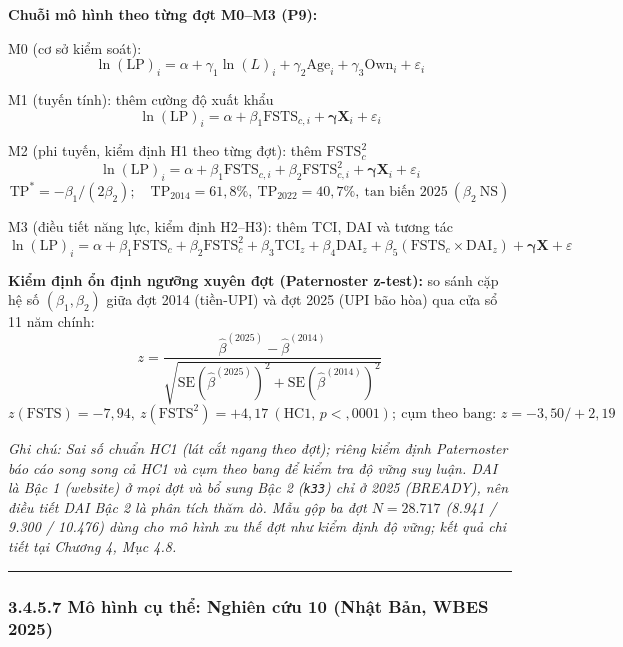 \documentclass[
  a4paper,
  13pt]{extreport}
\begin{document}
\textbf{Chuỗi mô hình theo từng đợt M0--M3 (P9):}

M0 (cơ sở kiểm soát):
\[\ln(\mathrm{LP})_{i} = \alpha + \gamma_1 \ln(L)_{i} + \gamma_2 \mathrm{Age}_{i} + \gamma_3 \mathrm{Own}_{i} + \varepsilon_{i}\]

M1 (tuyến tính): thêm cường độ xuất khẩu
\[\ln(\mathrm{LP})_{i} = \alpha + \beta_1 \mathrm{FSTS}_{c,i} + \boldsymbol{\gamma}\mathbf{X}_{i} + \varepsilon_{i}\]

M2 (phi tuyến, kiểm định H1 theo từng đợt): thêm
\(\mathrm{FSTS}_{c}^{2}\)
\[\ln(\mathrm{LP})_{i} = \alpha + \beta_1 \mathrm{FSTS}_{c,i} + \beta_2 \mathrm{FSTS}_{c,i}^{2} + \boldsymbol{\gamma}\mathbf{X}_{i} + \varepsilon_{i}\]
\[\mathrm{TP}^{*} = -\beta_1/(2\beta_2);\quad \mathrm{TP}_{2014} = 61{,}8\%,\ \mathrm{TP}_{2022} = 40{,}7\%,\ \text{tan biến } 2025\ (\beta_2\ \text{NS})\]

M3 (điều tiết năng lực, kiểm định H2--H3): thêm TCI, DAI và tương tác
\[\ln(\mathrm{LP})_{i} = \alpha + \beta_1 \mathrm{FSTS}_{c} + \beta_2 \mathrm{FSTS}_{c}^{2} + \beta_3 \mathrm{TCI}_{z} + \beta_4 \mathrm{DAI}_{z} + \beta_5(\mathrm{FSTS}_{c}\times\mathrm{DAI}_{z}) + \boldsymbol{\gamma}\mathbf{X} + \varepsilon\]

\textbf{Kiểm định ổn định ngưỡng xuyên đợt (Paternoster z-test):} so
sánh cặp hệ số \((\beta_1, \beta_2)\) giữa đợt 2014 (tiền-UPI) và đợt
2025 (UPI bão hòa) qua cửa sổ 11 năm chính:
\[z = \frac{\hat\beta^{(2025)} - \hat\beta^{(2014)}}{\sqrt{\mathrm{SE}(\hat\beta^{(2025)})^2 + \mathrm{SE}(\hat\beta^{(2014)})^2}}\]
\[z(\mathrm{FSTS}) = -7{,}94,\ z(\mathrm{FSTS}^2) = +4{,}17\ (\text{HC1, } p < {,}0001);\ \text{cụm theo bang: } z = -3{,}50/+2{,}19\]

\emph{Ghi chú: Sai số chuẩn HC1 (lát cắt ngang theo đợt); riêng kiểm
định Paternoster báo cáo song song cả HC1 và cụm theo bang để kiểm tra
độ vững suy luận. DAI là Bậc 1 (website) ở mọi đợt và bổ sung Bậc 2
(\texttt{k33}) chỉ ở 2025 (BREADY), nên điều tiết DAI Bậc 2 là phân tích
thăm dò. Mẫu gộp ba đợt \(N = 28.717\) (8.941 / 9.300 / 10.476) dùng cho
mô hình xu thế đợt như kiểm định độ vững; kết quả chi tiết tại Chương 4,
Mục 4.8.}

\begin{center}\rule{0.5\linewidth}{0.5pt}\end{center}

\hypertarget{muxf4-huxecnh-cux1ee5-thux1ec3-nghiuxean-cux1ee9u-10-nhux1eadt-bux1ea3n-wbes-2025}{%
\subsubsection{3.4.5.7 Mô hình cụ thể: Nghiên cứu 10 (Nhật Bản, WBES
2025)}\label{muxf4-huxecnh-cux1ee5-thux1ec3-nghiuxean-cux1ee9u-10-nhux1eadt-bux1ea3n-wbes-2025}}
\end{document}
